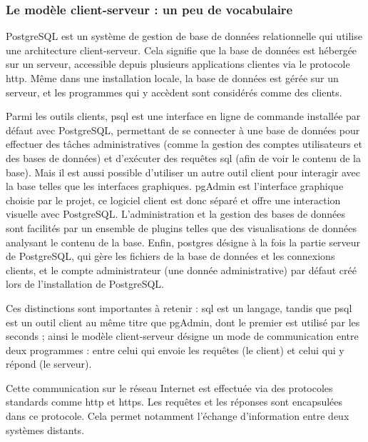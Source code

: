 \subsubsection{Le modèle client-serveur : un peu de vocabulaire}
PostgreSQL est un système de gestion de base de données relationnelle qui utilise une architecture client-serveur. Cela signifie que la base de données est hébergée sur un serveur, accessible depuis plusieurs applications clientes via le protocole \acrshort{http}. Même dans une installation locale, la base de données est gérée sur un serveur, et les programmes qui y accèdent sont considérés comme des clients.

Parmi les outils clients, psql est une interface en ligne de commande installée par défaut avec PostgreSQL, permettant de se connecter à une base de données pour effectuer des tâches administratives (comme la gestion des comptes utilisateurs et des bases de données) et d'exécuter des requêtes \acrshort{sql} (afin de voir le contenu de la base). Mais il est aussi possible d'utiliser un autre outil client pour interagir avec la base telles que les interfaces graphiques. pgAdmin est l'interface graphique choisie par le projet, ce logiciel client est donc séparé et offre une interaction visuelle avec PostgreSQL. L'administration et la gestion des bases de données sont facilités par un ensemble de plugins telles que des visualisations de données analysant le contenu de la base. Enfin, postgres désigne à la fois la partie serveur de PostgreSQL, qui gère les fichiers de la base de données et les connexions clients, et le compte administrateur (une donnée administrative) par défaut créé lors de l'installation de PostgreSQL. 

Ces distinctions sont importantes à retenir : \acrshort{sql} est un langage, tandis que psql est un outil client au même titre que pgAdmin, dont le premier est utilisé par les seconds ; ainsi le modèle client-serveur désigne un mode de communication entre deux programmes : entre celui qui envoie les requêtes (le client) et celui qui y répond (le serveur). 

Cette communication sur le réseau Internet est effectuée via des protocoles standards comme \acrshort{http} et \acrshort{https}. Les requêtes et les réponses sont encapsulées dans ce protocole. Cela permet notamment l'échange d'information entre deux systèmes distants. 

